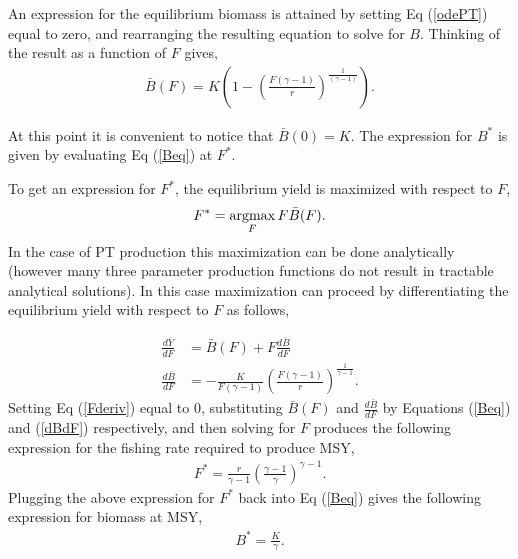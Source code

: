 \documentclass[12pt]{article}
\newcommand{\argmax}{\operatornamewithlimits{argmax}}
\begin{document}
{An expression for the equilibrium biomass is attained by setting Eq (\ref{odePT}) 
equal to zero, and rearranging the resulting equation to solve for $B$. 
Thinking of the result as a function of $F$ gives, 
\begin{align}
\bar B(F) = K\left(1-\left(\frac{F(\gamma-1)}{r}\right)^{\frac{1}{(\gamma-1)}}\right). \label{Beq}
\end{align}

At this point it is convenient to notice that $\bar B(0)=K$. The expression for $B^*$ is given by evaluating Eq (\ref{Beq}) at $F^*$.

%
To get an expression for $F^*$, the equilibrium yield is maximized with respect to $F$,
\begin{equation}
F^* = \argmax_F F\bar B(F).
\end{equation}
%
In the case of PT production this maximization can be done analytically (however 
many three parameter production functions do not result in tractable analytical 
solutions). In this case maximization can proceed by differentiating the 
equilibrium yield with respect to $F$ as follows,

%
\begin{align}
\frac{d \bar{Y}}{dF} &= \bar B(F) + F \frac{d \bar B}{dF} \label{Fderiv}\\
\frac{d \bar B}{dF} &= -\frac{K}{F(\gamma-1)}\left(\frac{F(\gamma-1)}{r}\right)^{\frac{1}{\gamma-1}}\label{dBdF}.
\end{align}
Setting Eq (\ref{Fderiv}) equal to 0, substituting $\bar B(F)$ and 
$\frac{d \bar B}{dF}$ by Equations (\ref{Beq}) and (\ref{dBdF}) respectively, 
and then solving for $F$ produces the following expression for the fishing 
rate required to produce MSY, %
%
\begin{align}
F^* = \frac{r}{\gamma-1} \left(\frac{\gamma-1}{\gamma}\right)^{\gamma-1}. \label{Fmsy}
\end{align}
%
Plugging the above expression for $F^*$ back into Eq (\ref{Beq}) gives the 
following expression for biomass at MSY, 
\begin{align}
B^* = \frac{K}{\gamma} \label{Bmsy}. %
\end{align}

}
\end{document}
